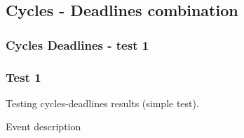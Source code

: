 \documentclass[8pt]{beamer}
\begin{document}
\subsection{Cycles - Deadlines combination}
\begin{frame}
    \frametitle{Cycles Deadlines - test 1}
    \subsubsection{Test 1}
    \small
    Testing cycles-deadlines results (simple test).\linebreak
    \begin{minipage}{0.4\linewidth}
        \begin{table}[t!]
            \caption{Event description}
            \begin{center}


\end{center}
\end{table}
\end{minipage}
\end{frame}
\end{document}

